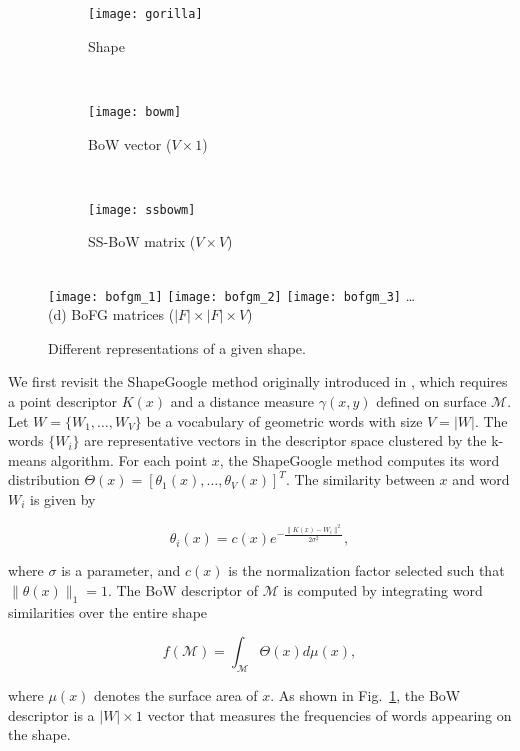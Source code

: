 \begin{figure}
\centering
\begin{subfigure}[b]{0.23\textwidth}
 \texttt{[image: gorilla]}
 \caption{\scriptsize Shape}
\end{subfigure}%
~
\begin{subfigure}[b]{0.37\textwidth}
 \texttt{[image: bowm]}
 \caption{\scriptsize BoW vector ($V \times 1$)}
\end{subfigure}%
~
\begin{subfigure}[b]{0.27\textwidth}
 \texttt{[image: ssbowm]}
 \caption{\scriptsize SS-BoW matrix ($V\times V$)}
\end{subfigure}
\\
\texttt{[image: bofgm\_1]}
\texttt{[image: bofgm\_2]}
\texttt{[image: bofgm\_3]}
\dots\\
{\scriptsize (d) BoFG matrices ($|F| \times |F| \times V$)}
\caption{Different representations of a given shape.}
\label{fig:represent}
\end{figure}

We first revisit the ShapeGoogle method originally introduced in \cite{Ovsjanikov:2009}, 
which requires a point descriptor $K(x)$ and a distance measure $\gamma(x,y)$ defined on 
surface $\mathcal{M}$. 
Let $W=\{W_1,\dots,W_V\}$ be a vocabulary of geometric words with size $V=|W|$. 
The words $\{W_i\}$ are representative vectors in the descriptor space
clustered by the k-means algorithm. For each point $x$, the ShapeGoogle method computes its word 
distribution $\Theta(x)=[\theta_1(x),\dots,\theta_V(x)]^T$. The similarity between $x$ and 
word $W_i$ is given by

\begin{equation}\label{eq:similar}
\theta_i(x)=c(x)e^{-\frac{\|K(x)-W_i\|^2}{2\sigma^2}},
\end{equation}

where $\sigma$ is a parameter, and $c(x)$ is the normalization factor selected 
such that $\|\theta(x)\|_1 = 1$. The BoW descriptor of $\mathcal{M}$ is 
computed by integrating word similarities over the entire shape

\begin{equation}
f(\mathcal{M})=\int_\mathcal{M}\Theta(x)d\mu(x),
\end{equation}

where $\mu(x)$ denotes the surface area of $x$. As shown in Fig.~\ref{fig:represent},
the BoW descriptor is a $|W|\times 1$ vector that measures the frequencies of words 
appearing on the shape. 

